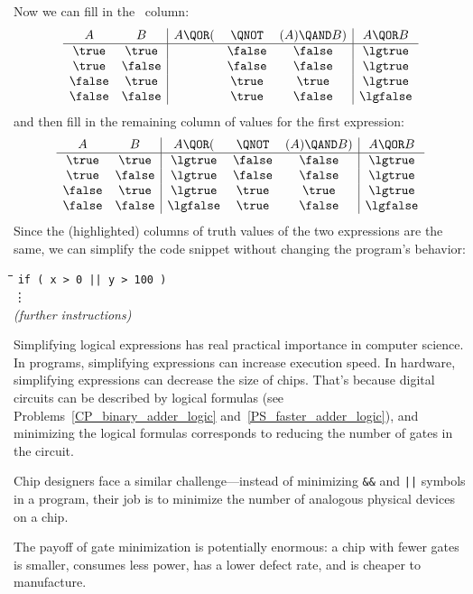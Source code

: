 Now we can fill in the \QAND\ column:
\[
\begin{array}{cc|ccc|c}
A      & B      & A \QOR  (&\QNOT   &(A) \QAND  B) & A \QOR  B \\ \hline
\true  & \true  &          & \false &     \false   & \lgtrue \\
\true  & \false &          & \false &     \false   & \lgtrue \\
\false & \true  &          & \true  &     \true    & \lgtrue \\
\false & \false &          & \true  &     \false   & \lgfalse\\
\end{array}
\]
and then fill in the remaining column of values for the first expression:
\[
\begin{array}{cc|ccc|c}
A      & B      & A \QOR  (&\QNOT   &(A) \QAND  B) & A \QOR  B \\ \hline
\true  & \true  & \lgtrue  & \false &     \false   & \lgtrue \\
\true  & \false & \lgtrue  & \false &     \false   & \lgtrue \\
\false & \true  & \lgtrue  & \true  &     \true    & \lgtrue \\
\false & \false & \lgfalse & \true  &     \false   & \lgfalse\\
\end{array}
\]
Since the (highlighted) columns of truth values of the two expressions are
the same, we can simplify the code snippet without changing the program's
behavior:
%
\begin{tabbing}
\hspace{1in} \= \quad\quad \= \quad\quad \= \quad\quad \= \kill
\> \texttt{if ( x > 0 || y > 100 )} \\
\> \> \vdots\\
\> \emph{(further instructions)}
\end{tabbing}

 Simplifying logical expressions has real practical
importance in computer science.  In programs, simplifying expressions
can increase execution speed.  In hardware, simplifying expressions
can decrease the size of chips.  That's because digital circuits can
be described by logical formulas (see
Problems~\ref{CP_binary_adder_logic} and~\ref{PS_faster_adder_logic}),
and minimizing the logical formulas corresponds to reducing the number
of gates in the circuit.
\begin{editingnotes}
   Chip designers face a similar challenge---instead of
  minimizing \texttt{\&\&} and \texttt{||} symbols in a program, their job
  is to minimize the number of analogous physical devices on a chip.
\end{editingnotes}
The payoff of gate minimization is potentially enormous: a chip with
fewer gates is smaller, consumes less power, has a lower defect rate,
and is cheaper to manufacture.

